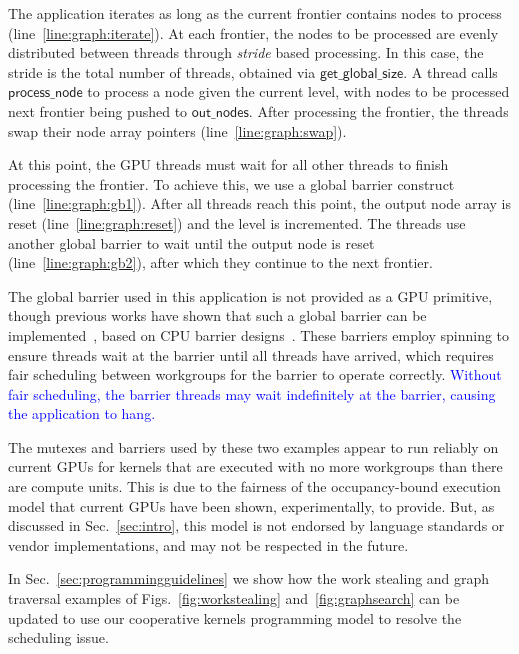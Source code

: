 \documentclass[sigconf]{acmart}
\newcommand{\TSAdded}[1]{\textcolor{blue}{#1}}
\newcommand{\myfigs}{Figs.~}
\newcommand{\mysec}{Sec.~}
\newcommand{\code}[1]{\lstset{basicstyle=\tt}\lstinline!#1!\lstset{basicstyle=\scriptsize\tt}}
\newcommand{\getglobalsize}{\mathsf{get\_global\_size}}
\newcommand{\keyword}[1]{\mathsf{#1}}
\begin{document}
The application iterates as long as the current frontier contains
nodes to process (line~\ref{line:graph:iterate}). At each frontier,
the nodes to be processed are evenly distributed between
threads through \emph{stride} based processing.
%
In this case, the stride is the total number of threads, obtained via
$\getglobalsize$.  
A thread calls $\keyword{process\_node}$ to process a node given the current level, with nodes to be processed next frontier being pushed to $\keyword{out\_nodes}$. After processing the frontier, the threads swap their
node array pointers (line~\ref{line:graph:swap}).

At this point, the GPU threads must wait for all other threads to
finish processing the frontier. To achieve
this, we use a global barrier construct
(line~\ref{line:graph:gb1}). After all threads reach this point, the
output node array is reset (line~\ref{line:graph:reset}) and the level
is incremented. The threads use another global barrier to wait until the output node is
reset (line~\ref{line:graph:gb2}), after which they continue to the next frontier.

The global barrier used in this application is not provided as a GPU
primitive, though previous works have shown that such a global barrier
can be implemented~\cite{XF10,DBLP:conf/oopsla/SorensenDBGR16}, based
on CPU barrier designs~\cite[ch. 17]{HS08}.  These barriers employ
spinning to ensure threads wait at the barrier until all threads have
arrived, which requires fair scheduling between workgroups for the
barrier to operate correctly. \TSAdded{Without fair scheduling, the
  barrier threads may wait indefinitely at the barrier, causing the
  application to hang.}


The mutexes and barriers used by these two examples appear to run
reliably on current GPUs for kernels that are executed with no more
workgroups than there are compute units.  This is due to the fairness
of the occupancy-bound execution model that current GPUs have been
shown, experimentally, to provide.  But, as discussed in
\mysec\ref{sec:intro}, this model is not endorsed by language
standards or vendor implementations, and may not be respected
in the future. 
%

In \mysec\ref{sec:programmingguidelines} we show how the work stealing
and graph traversal examples of \myfigs\ref{fig:workstealing} and~\ref{fig:graphsearch} can be
updated to use our cooperative kernels programming model to resolve
the scheduling issue.
\end{document}
